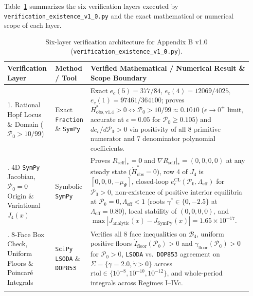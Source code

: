\documentclass[11pt,a4paper]{article}
\theoremstyle{definition}
\begin{document}
Table~\ref{tab:vrk_matrix} summarizes the six verification layers executed by \texttt{verification\_existence\_v1\_0.py} and the exact mathematical or numerical scope of each layer.

\begin{table}[ht!]
\centering
\caption{Six-layer verification architecture for Appendix B v1.0 (\texttt{verification\_existence\_v1\_0.py}).}
\label{tab:vrk_matrix}
\vspace{4pt}
{\footnotesize
\begin{tabularx}{\textwidth}{@{}p{36mm}p{32mm}X@{}}
\toprule
\textbf{Verification Layer} & \textbf{Method / Tool} & \textbf{Verified Mathematical / Numerical Result \& Scope Boundary} \\
\midrule
1. Rational Hopf Locus \& Domain ($\mathcal{P}_0 > 10/99$) & Exact \texttt{Fraction} \& \texttt{SymPy} & Exact $e_c(5)=377/84$, $e_c(4)=12069/4025$, $e_c(1)=97461/364100$; proves $H_{\mathrm{obs},\mathrm{v1.4}}^* > 0 \iff \mathcal{P}_0 > 10/99 \approx 0.1010$ ($\epsilon \to 0^+$ limit, accurate at $\epsilon=0.05$ for $\mathcal{P}_0 \ge 0.105$) and $de_c/d\mathcal{P}_0 > 0$ via positivity of all 8 primitive numerator and 7 denominator polynomial coefficients. \\
\addlinespace[2pt]
2. 4D \texttt{SymPy} Jacobian, $\mathcal{P}_0=0$ Origin \& Variational $J_4(x)$ & Symbolic \texttt{SymPy} & Proves $R_{\mathrm{self}}|_{*} = 0$ and $\nabla R_{\mathrm{self}}|_{*} = (0,0,0,0)$ at any steady state ($\dot{H}_{\mathrm{obs}}^*=0$), row 4 of $J_4$ is $[0,0,0,-\mu_\Psi]$, closed-loop $e_c^{\mathrm{CL}}(\mathcal{P}_0, \Lambda_{\mathrm{eff}})$ for $\mathcal{P}_0 > 0$, non-existence of positive interior equilibria at $\mathcal{P}_0 = 0, \Lambda_{\mathrm{eff}} < 1$ (roots $\gamma^* \in \{0, -2.5\}$ at $\Lambda_{\mathrm{eff}}=0.80$), local stability of $(0,0,0,0)$, and $\max |J_{\mathrm{analytic}}(x) - J_{\mathrm{SymPy}}(x)| = 1.65 \times 10^{-17}$. \\
\addlinespace[2pt]
3. 8-Face Box Check, Uniform Floors \& Poincar\'e Integrals & \texttt{SciPy} \texttt{LSODA} \& \texttt{DOP853} & Verifies all 8 face inequalities on $\mathcal{B}_4$, uniform positive floors $\dot{I}_{\mathrm{floor}}(\mathcal{P}_0) > 0$ and $\gamma_{\mathrm{floor}}(\mathcal{P}_0) > 0$ for $\mathcal{P}_0 > 0$, \texttt{LSODA} vs.\ \texttt{DOP853} agreement on $\Sigma = \{\gamma=2.0, \dot{\gamma}>0\}$ across $\mathrm{rtol} \in \{10^{-8}, 10^{-10}, 10^{-12}\}$, and whole-period integrals across Regimes I--IVc. \\
\addlinespace[2pt]

\end{tabularx}}
\end{table}
\end{document}

